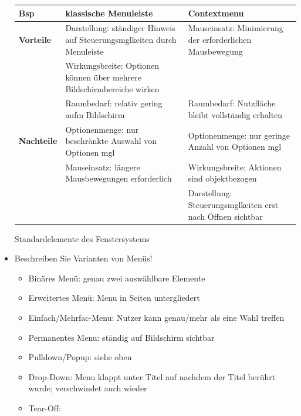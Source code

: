 \begin{itemize}
\begin{table}[!h]
\begin{tabular}{|l|p{15em}|p{15em}|}
			\textbf{Bsp} &klassische Menuleiste & Contextmenu\\
			\hline			
			\textbf{Vorteile} & Darstellung: ständiger Hinweis auf Steuerungsmglkeiten durch Menuleiste & Mauseinsatz: Minimierung der erforderlichen Mausbewegung\\
			& Wirkungsbreite: Optionen können über mehrere Bildschirmbereiche wirken & \\
			& Raumbedarf: relativ gering aufm Bildschirm& Raumbedarf: Nutzfläche bleibt vollständig erhalten\\
			\hline
			\textbf{Nachteile} & Optionenmenge: nur beschränkte Auswahl von Optionen mgl & Optionenmenge: nur geringe Anzahl von Optionen mgl \\
			& Mauseinsatz: längere Mausbewegungen erforderlich & Wirkungsbreite: Aktionen sind objektbezogen\\
			&&Darstellung: Steuerungsmglkeiten erst nach Öffnen sichtbar \\
			\hline
		\end{tabular}
	\end{table}
	Standardelemente des Fenstersystems
	\item Beschreiben Sie Varianten von Menüs!
	\begin{itemize}
		\item Binäres Menü: genau zwei auswählbare Elemente
		\item Erweitertes Menü: Menu in Seiten untergliedert
		\item Einfach/Mehrfac-Menu: Nutzer kann genau/mehr als eine Wahl treffen
		\item Permanentes Menu: ständig auf Bildschirm sichtbar
		\item Pulldown/Popup: siehe oben
		\item Drop-Down: Menu klappt unter Titel auf nachdem der Titel berührt wurde; verschwindet auch wieder
		\item Tear-Off: 
	\end{itemize}
	

\end{itemize}
